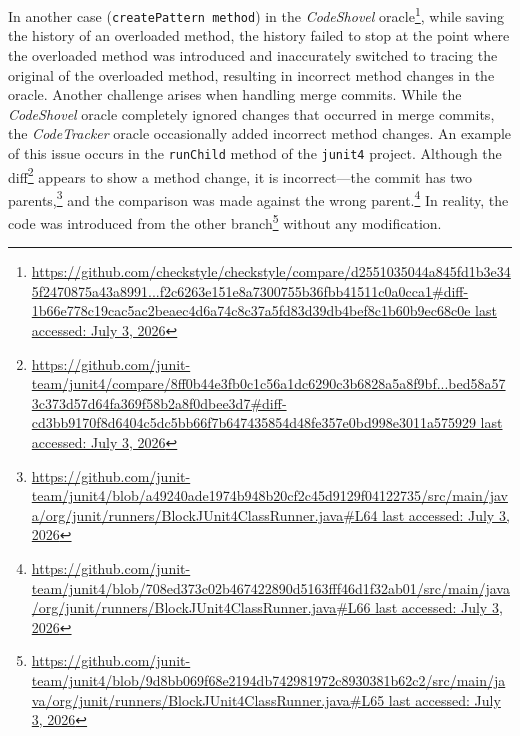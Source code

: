 In another case (\texttt{createPattern method}) in the \textit{CodeShovel} oracle\footnote{\href{https://github.com/checkstyle/checkstyle/compare/d2551035044a845fd1b3e345f2470875a43a8991...f2c6263e151e8a7300755b36fbb41511c0a0cca1\#diff-1b66e778c19cac5ac2beaec4d6a74c8c37a5fd83d39db4bef8c1b60b9ec68c0e}{https://github.com/checkstyle/checkstyle/compare/d2551035044a845fd1b3e345f2470875a43a8991...\allowbreak f2c6263e151e8a7300755b36fbb41511c0a0cca1\#diff-1b66e778c19cac5ac2beaec4d6a74c8c37a5fd83d39db4bef\allowbreak 8c1b60b9ec68c0e last accessed: July 3, 2026}}, while saving the history of an overloaded method, the history failed to stop at the point where the overloaded method was introduced and inaccurately switched to tracing the original of the overloaded method, resulting in incorrect method changes in the oracle. Another challenge arises when handling merge commits. While the \textit{CodeShovel} oracle completely ignored changes that occurred in merge commits, the \textit{CodeTracker} oracle occasionally added incorrect method changes. An example of this issue occurs in the \texttt{runChild} method of the \texttt{junit4} project. Although the diff\footnote{\href{https://github.com/junit-team/junit4/compare/8ff0b44e3fb0c1c56a1dc6290c3b6828a5a8f9bf...bed58a573c373d57d64fa369f58b2a8f0dbee3d7\#diff-cd3bb9170f8d6404c5dc5bb66f7b647435854d48fe357e0bd998e3011a575929}{https://github.com/junit-team/junit4/compare/8ff0b44e3fb0c1c56a1dc6290c3b6828a5a8f9bf...\allowbreak bed58a573c373d57d64fa369f58b2a8f0dbee3d7\#diff-cd3bb9170f8d6404c5dc5bb66f7b647435854d48fe357e0bd\allowbreak998e3011a575929 last accessed: July 3, 2026}} appears to show a method change, it is incorrect—the commit has two parents,\footnote{\href{https://github.com/junit-team/junit4/blob/a49240ade1974b948b20cf2c45d9129f04122735/src/main/java/org/junit/runners/BlockJUnit4ClassRunner.java\#L64}{https://github.com/junit-team/junit4/blob/a49240ade1974b948b20cf2c45d9129f04122735\allowbreak/src/main/java/org/junit/runners/BlockJUnit4ClassRunner.java\#L64 last accessed: July 3, 2026}} and the comparison was made against the wrong parent.\footnote{\href{https://github.com/junit-team/junit4/blob/708ed373c02b467422890d5163fff46d1f32ab01/src/main/java/org/junit/runners/BlockJUnit4ClassRunner.java\#L66}{https://github.com/junit-team/junit4/blob/708ed373c02b467422890d5163fff46d1f32ab01\allowbreak/src/main/java/org/junit/runners/BlockJUnit4ClassRunner.java\#L66 last accessed: July 3, 2026}} In reality, the code was introduced from the other branch\footnote{\href{https://github.com/junit-team/junit4/blob/9d8bb069f68e2194db742981972c8930381b62c2/src/main/java/org/junit/runners/BlockJUnit4ClassRunner.java\#L65}{https://github.com/junit-team/junit4/blob/9d8bb069f68e2194db742981972c8930381b62c2\allowbreak/src/main/java/org/junit/runners/BlockJUnit4ClassRunner.java\#L65 last accessed: July 3, 2026}} without any modification.


